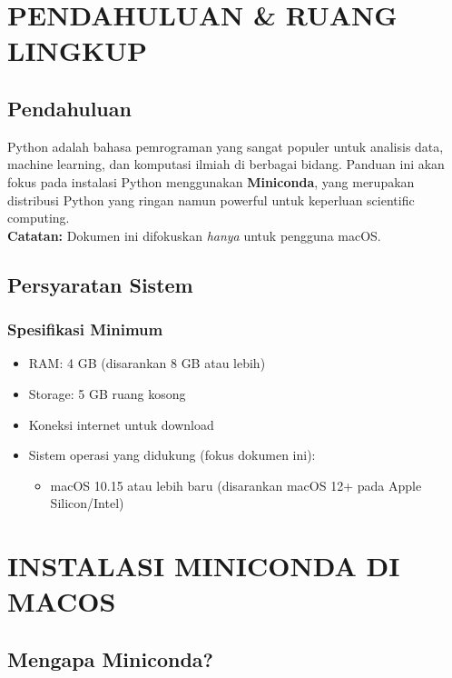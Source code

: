 \chapter{PENDAHULUAN \& RUANG LINGKUP}

\section{Pendahuluan}

Python adalah bahasa pemrograman yang sangat populer untuk analisis data, machine learning, dan komputasi ilmiah di berbagai bidang. Panduan ini akan fokus pada instalasi Python menggunakan \textbf{Miniconda}, yang merupakan distribusi Python yang ringan namun powerful untuk keperluan scientific computing.
\\
\textbf{Catatan:} Dokumen ini difokuskan \emph{hanya} untuk pengguna macOS.

\section{Persyaratan Sistem}

\subsection{Spesifikasi Minimum}
\begin{itemize}
    \item RAM: 4 GB (disarankan 8 GB atau lebih)
    \item Storage: 5 GB ruang kosong
    \item Koneksi internet untuk download
    \item Sistem operasi yang didukung (fokus dokumen ini):
    \begin{itemize}
        \item macOS 10.15 atau lebih baru (disarankan macOS 12+ pada Apple Silicon/Intel)
    \end{itemize}
\end{itemize}

\chapter{INSTALASI MINICONDA DI MACOS}

\section{Mengapa Miniconda?}

